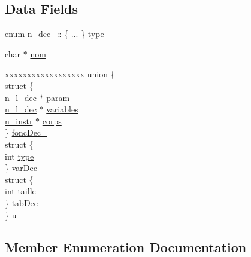 \subsection*{Data Fields}
\begin{DoxyCompactItemize}
\item 
enum n\+\_\+dec\+\_\+\+:: \{ ... \}  \hyperlink{structn__dec___ac23505a415708f3ba2bdac410063f7c0}{type}
\item 
char $\ast$ \hyperlink{structn__dec___aa8951975f0428e53734891c00014dee5}{nom}
\item 
\begin{tabbing}
xx\=xx\=xx\=xx\=xx\=xx\=xx\=xx\=xx\=\kill
union \{\\
\>struct \{\\
\>\>\hyperlink{syntabs_8h_ab260b396f6175518fe4d37ca38ded54e}{n\_l\_dec} $\ast$ \hyperlink{structn__dec___a5e65ccbffed79af2c5fd3e21fa806187}{param}\\
\>\>\hyperlink{syntabs_8h_ab260b396f6175518fe4d37ca38ded54e}{n\_l\_dec} $\ast$ \hyperlink{structn__dec___a3f9c53db6f8f024820021a28974e6a9d}{variables}\\
\>\>\hyperlink{syntabs_8h_a23ea3d0367a10d34c91c5349a8a9433c}{n\_instr} $\ast$ \hyperlink{structn__dec___a020bea0eaa25d531627414372fab564a}{corps}\\
\>\} \hyperlink{structn__dec___a4d5e8d9de7239cf2ae244ff3d63c3a31}{foncDec\_}\\
\>struct \{\\
\>\>int \hyperlink{structn__dec___a4011cd805dd5d7e02f15c757d3945cfd}{type}\\
\>\} \hyperlink{structn__dec___a08ab11dd0c1fd82d3251e02f465ff38f}{varDec\_}\\
\>struct \{\\
\>\>int \hyperlink{structn__dec___acbe17db39c47ba03ce42896c2a7b70bd}{taille}\\
\>\} \hyperlink{structn__dec___ad700769bc614fceb4302b177176f13eb}{tabDec\_}\\
\} \hyperlink{structn__dec___af0174babc6aca640efdc1aa73a7f78bf}{u}\\

\end{tabbing}\end{DoxyCompactItemize}


\subsection{Member Enumeration Documentation}
